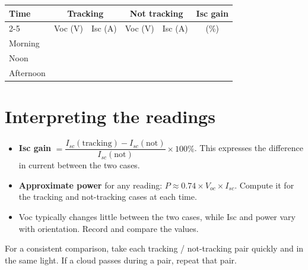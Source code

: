 \documentclass[11pt]{article}
\begin{document}
\begin{center}
\begin{tabular}{|l|c|c|c|c|c|}
\hline
\textbf{Time} & \multicolumn{2}{c|}{\textbf{Tracking}} & \multicolumn{2}{c|}{\textbf{Not tracking}} & \textbf{Isc gain} \\ \cline{2-5}
 & Voc (V) & Isc (A) & Voc (V) & Isc (A) & (\%) \\ \hline
Morning  & \quad\quad & \quad\quad & \quad\quad & \quad\quad & \quad\quad \\ \hline
Noon     & & & & & \\ \hline
Afternoon& & & & & \\ \hline
\end{tabular}
\end{center}

\section{Interpreting the readings}
\begin{itemize}[leftmargin=1.6em]
  \item \textbf{Isc gain} $=\dfrac{I_{sc}(\text{tracking}) - I_{sc}(\text{not})}{I_{sc}(\text{not})}\times 100\%$.
        This expresses the difference in current between the two cases.
  \item \textbf{Approximate power} for any reading: $P \approx 0.74 \times V_{oc}\times I_{sc}$.
        Compute it for the tracking and not-tracking cases at each time.
  \item Voc typically changes little between the two cases, while Isc and power vary with
        orientation. Record and compare the values.
\end{itemize}

\begin{note}
For a consistent comparison, take each tracking / not-tracking pair quickly and in the
same light. If a cloud passes during a pair, repeat that pair.
\end{note}

\end{document}
